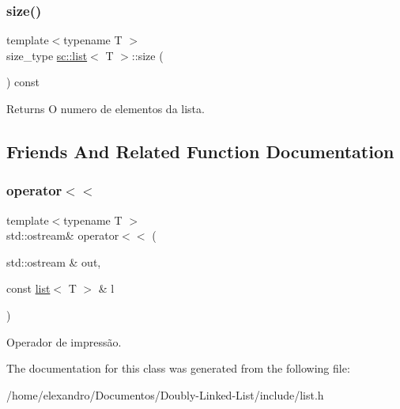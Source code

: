 \subsubsection{\texorpdfstring{size()}{size()}}
{\footnotesize\ttfamily template$<$typename T $>$ \\
size\+\_\+type \hyperlink{classsc_1_1list}{sc\+::list}$<$ T $>$\+::size (\begin{DoxyParamCaption}{ }\end{DoxyParamCaption}) const\hspace{0.3cm}{\ttfamily [inline]}}

\begin{DoxyReturn}{Returns}
O numero de elementos da lista. 
\end{DoxyReturn}


\subsection{Friends And Related Function Documentation}
\mbox{\label{classsc_1_1list_a6b15619e773f20f5e37890eaac098b78}} 
\subsubsection{\texorpdfstring{operator$<$$<$}{operator<<}}
{\footnotesize\ttfamily template$<$typename T $>$ \\
std\+::ostream\& operator$<$$<$ (\begin{DoxyParamCaption}\item[{std\+::ostream \&}]{out,  }\item[{const \hyperlink{classsc_1_1list}{list}$<$ T $>$ \&}]{l }\end{DoxyParamCaption})\hspace{0.3cm}{\ttfamily [friend]}}

Operador de impressão. 

The documentation for this class was generated from the following file\+:\begin{DoxyCompactItemize}
\item 
/home/elexandro/\+Documentos/\+Doubly-\/\+Linked-\/\+List/include/list.\+h\end{DoxyCompactItemize}
